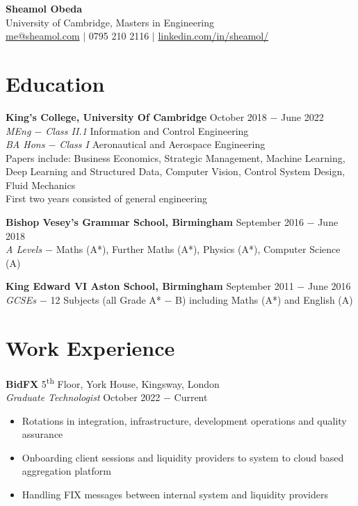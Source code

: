 \documentclass{article}
\begin{document}
\layout
\begin{center}

\LARGE \textbf{Sheamol Obeda\\}
\Large {\color{DarkSlateBlue} University of Cambridge, Masters in Engineering}\\
\normalsize \href{mailto: me@sheamol.com}{me@sheamol.com} $\mid$ 0795 210 2116 $\mid$ \href{https://www.linkedin.com/in/sheamol/}{linkedin.com/in/sheamol/}\\
\vspace{-.5\baselineskip}
\hrulefill
\vspace{-.5\baselineskip}
\end{center}

\section*{Education}

\textbf{King's College, University Of Cambridge}  \hfill October 2018 $-$ June 2022\\
\textit{MEng $-$ Class II.1} Information and Control Engineering\\
\textit{BA Hons $-$ Class I} Aeronautical and Aerospace Engineering \\
Papers include: Business Economics, Strategic Management, Machine Learning, Deep Learning and Structured Data, Computer Vision, Control System Design,  Fluid Mechanics \\
First two years consisted of general engineering \medskip

\textbf{Bishop Vesey's Grammar School, Birmingham} \hfill September 2016 $-$ June 2018 \\
\textit{A Levels $-$} Maths (A*), Further Maths (A*), Physics (A*), Computer Science (A) \medskip

\textbf{King Edward VI Aston School, Birmingham} \hfill September 2011 $-$ June 2016 \\
\textit{GCSEs $-$} 12 Subjects (all Grade A* $-$  B) including Maths (A*) and English (A)

\vspace{-.5\baselineskip}
\hrulefill
\vspace{-.5\baselineskip}

\section*{Work Experience}

\textbf{BidFX} \hfill 5\textsuperscript{th} Floor, York House, Kingsway, London\\
\textit{Graduate Technologist} \hfill October 2022 $-$ Current
\begin{itemize}
    \item Rotations in integration, infrastructure, development operations and quality assurance
    \item Onboarding client sessions and liquidity providers to system to cloud based aggregation platform
    \item Handling FIX messages between internal system and liquidity providers
\end{itemize} \medskip
\end{document}
